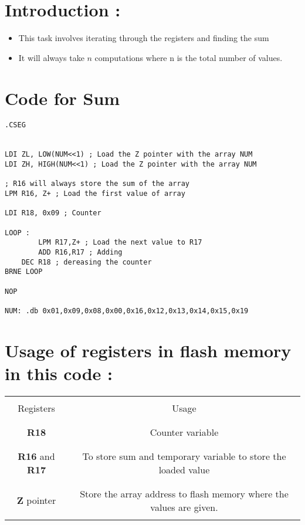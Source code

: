 \begin{center}
    \fbox{\Large{\textbf{\textcolor{red}{Finding the sum of numbers}}}}
\end{center}
\section*{Introduction :}
\begin{itemize}
    \item This task involves iterating through the registers and finding the sum
    \item It will always take $n$ computations where n is the total number of values.
\end{itemize}

\section*{Code for Sum}

{\renewcommand\fcolorbox[4][]{\textcolor{cyan}{\strut#4}}
        \begin{verbatim}
.CSEG


LDI ZL, LOW(NUM<<1) ; Load the Z pointer with the array NUM
LDI ZH, HIGH(NUM<<1) ; Load the Z pointer with the array NUM

; R16 will always store the sum of the array
LPM R16, Z+ ; Load the first value of array 

LDI R18, 0x09 ; Counter

LOOP : 
        LPM R17,Z+ ; Load the next value to R17
        ADD R16,R17 ; Adding 
	DEC R18 ; dereasing the counter
BRNE LOOP

NOP

NUM: .db 0x01,0x09,0x08,0x00,0x16,0x12,0x13,0x14,0x15,0x19
        \end{verbatim}
}

\section*{Usage of registers in flash memory in this code : }
\begin{center}
    \begin{tabular}{|c|c|}
        \hline
        & \\
            Registers  &  Usage 
        \\ & \\
        \hline
        & \\
            \textbf{R18} & Counter variable
        \\ & \\
        \hline
        & \\
            \textbf{R16} and \textbf{R17} & To store sum and temporary variable to store the loaded value
        \\ & \\
        \hline
        & \\
            \textbf{Z} pointer &  Store the array address to flash memory where the values are given.
        \\ & \\
        \hline
    \end{tabular}
\end{center}


